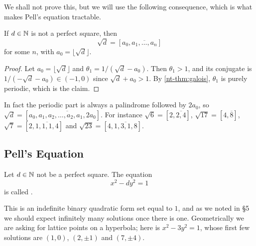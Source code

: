 \documentclass[a4paper]{scrartcl}
\begin{document}
We shall not prove this, but we will use the following consequence, which is what makes Pell's equation tractable.

\begin{corollary}\label{cor:sqrtd}
	If $d \in \mathbb{N}$ is not a perfect square, then
	$$
	\sqrt d = [a_0, \overline{a_1, \dots, a_n}]
	$$
	for some $n$, with $a_0 = \lfloor\sqrt d\rfloor$.
\end{corollary}
\begin{proof}
	Let $a_0 = \lfloor\sqrt d\rfloor$ and $\theta_1 = 1/(\sqrt d - a_0)$. Then $\theta_1 > 1$, and its conjugate is $1/(-\sqrt d - a_0) \in (-1, 0)$ since $\sqrt d + a_0 > 1$. By \autoref{nt-thm:galois}, $\theta_1$ is purely periodic, which is the claim.
\end{proof}

\begin{remark}
	In fact the periodic part is always a palindrome followed by $2a_0$, so $\sqrt d = [a_0, \overline{a_1, a_2, \dots, a_2, a_1, 2a_0}]$. For instance $\sqrt6 = [2,\overline{2,4}]$, $\sqrt{17} = [4, \overline 8]$, $\sqrt7 = [2, \overline{1,1,1,4}]$ and $\sqrt{23} = [4, \overline{1,3,1,8}]$.
\end{remark}

\subsection{Pell's Equation}

\begin{definition}
	Let $d \in \mathbb{N}$ not be a perfect square. The equation
	$$
	x^2 - dy^2 = 1
	$$
	is called .
\end{definition}

This is an indefinite binary quadratic form set equal to $1$, and as we noted in \S5 we should expect infinitely many solutions once there is one. Geometrically we are asking for lattice points on a hyperbola; here is $x^2 - 3y^2 = 1$, whose first few solutions are $(1,0)$, $(2, \pm1)$ and $(7, \pm4)$.

\begin{center}
\end{center}
\end{document}
